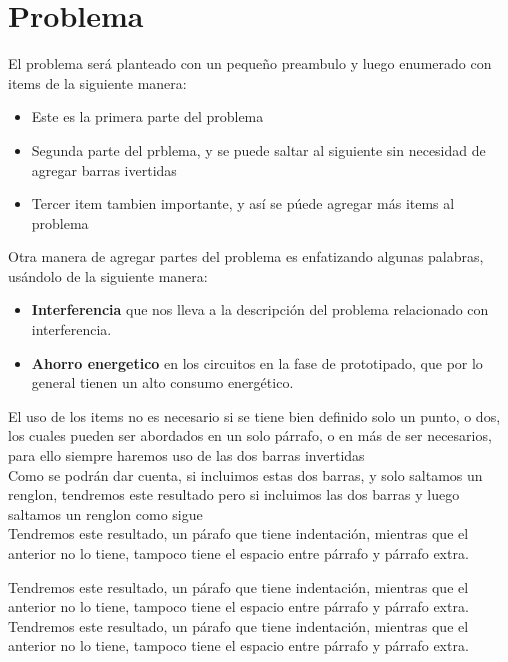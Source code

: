 \documentclass[a4paper]{IEEEtran} %
\begin{document}
\section{Problema}
\label{problema} %

El problema será planteado con un pequeño preambulo y luego enumerado con items de la siguiente manera:

    \begin{itemize}
    	\item Este es la primera parte del problema
    	\item Segunda parte del prblema, y se puede saltar al siguiente sin necesidad de agregar barras ivertidas %
		\item Tercer item tambien importante, y así se púede agregar más items al problema
	\end{itemize}

	Otra manera de agregar partes del problema es enfatizando algunas palabras, usándolo de la siguiente manera:

	\begin{itemize}
		\item \textbf{Interferencia} que nos lleva a la descripción del problema relacionado con interferencia.
		\item \textbf{Ahorro energetico} en los circuitos en la fase de prototipado, que por lo general tienen un alto consumo energético.
	\end{itemize}

El uso de los items no es necesario si se tiene bien definido solo un punto, o dos, los cuales pueden ser abordados en un solo párrafo, o en más de ser necesarios, para ello siempre haremos uso de las dos barras invertidas\\ %
Como se podrán dar cuenta, si incluimos estas dos barras, y solo saltamos un renglon, tendremos este resultado pero si incluimos las dos barras y luego saltamos un renglon como sigue \\

Tendremos este resultado, un párafo que tiene indentación, mientras que el anterior no lo tiene, tampoco tiene el espacio entre párrafo y párrafo extra.

Tendremos este resultado, un párafo que tiene indentación, mientras que el anterior no lo tiene, tampoco tiene el espacio entre párrafo y párrafo extra.
Tendremos este resultado, un párafo que tiene indentación, mientras que el anterior no lo tiene, tampoco tiene el espacio entre párrafo y párrafo extra.
\end{document}
